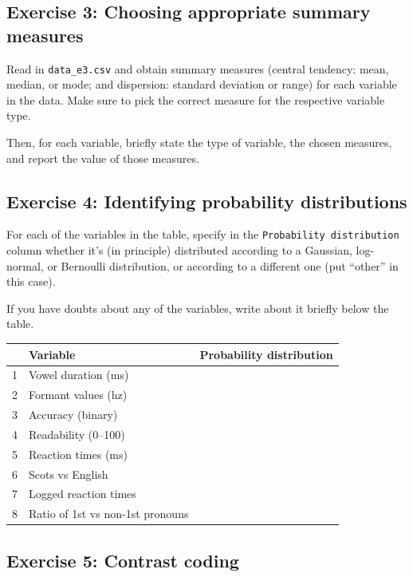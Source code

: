 \documentclass[
]{article}
\begin{document}
\hypertarget{exercise-3-choosing-appropriate-summary-measures}{%
\subsection{Exercise 3: Choosing appropriate summary
measures}\label{exercise-3-choosing-appropriate-summary-measures}}

Read in \texttt{data\_e3.csv} and obtain summary measures (central
tendency: mean, median, or mode; and dispersion: standard deviation or
range) for each variable in the data. Make sure to pick the correct
measure for the respective variable type.

Then, for each variable, briefly state the type of variable, the chosen
measures, and report the value of those measures.

\hypertarget{exercise-4-identifying-probability-distributions}{%
\subsection{Exercise 4: Identifying probability
distributions}\label{exercise-4-identifying-probability-distributions}}

For each of the variables in the table, specify in the
\texttt{Probability\ distribution} column whether it's (in principle)
distributed according to a Gaussian, log-normal, or Bernoulli
distribution, or according to a different one (put ``other'' in this
case).

If you have doubts about any of the variables, write about it briefly
below the table.

\begin{longtable}[]{@{}lll@{}}
\toprule()
& Variable & Probability distribution \\
\midrule()
\endhead
1 & Vowel duration (ms) & \\
2 & Formant values (hz) & \\
3 & Accuracy (binary) & \\
4 & Readability (0--100) & \\
5 & Reaction times (ms) & \\
6 & Scots vs English & \\
7 & Logged reaction times & \\
8 & Ratio of 1st vs non-1st pronouns & \\
\bottomrule()
\end{longtable}

\hypertarget{exercise-5-contrast-coding}{%
\subsection{Exercise 5: Contrast
coding}\label{exercise-5-contrast-coding}}
\end{document}
